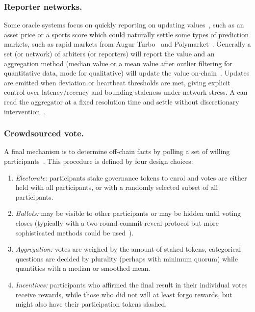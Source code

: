 \subsubsection{Reporter networks.}

Some oracle systems focus on quickly reporting on updating values~\cite{BCCJM21}, such as an asset price or a sports score which could naturally settle some types of prediction markets, such as rapid markets from Augur Turbo~\cite{aug25} and Polymarket~\cite{polylink}. Generally a set (or network) of arbiters (or reporters) will report the value and an aggregation method (\eg median value or a mean value after outlier filtering for quantitative data, mode for qualitative) will update the value on-chain~\cite{ClEsGS21}. Updates are emitted when deviation or heartbeat thresholds are met, giving explicit control over latency/recency and bounding staleness under network stress. A \depm can read the aggregator at a fixed resolution time and settle without discretionary intervention~\cite{aug25,thalesmarket_docs}. 

\subsubsection{Crowdsourced vote.}

A final mechanism is to determine off-chain facts by polling a set of willing participants~\cite{But13,Sz14,AKPWZ15,AKPWZ19,uma,kleros}. This procedure is defined by four design choices:

\begin{enumerate}
\item \textit{Electorate}: participants stake governance tokens to enrol and votes are either held with all participants, or with a randomly selected subset of all participants.
\item \textit{Ballots:} may be visible to other participants or may be hidden until voting closes (typically with a two-round commit-reveal protocol but more sophisticated methods could be used~\cite{GSZB23}).
\item \textit{Aggregation:} votes are weighed by the amount of staked tokens, categorical questions are decided by plurality (perhaps with minimum quorum) while quantities with a median or smoothed mean. 
\item \textit{Incentives:} participants who affirmed the final result in their individual votes receive rewards, while those who did not will at least forgo rewards, but might also have their participation tokens slashed. 
\end{enumerate}

